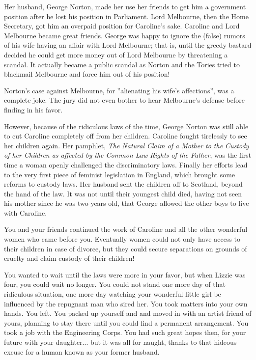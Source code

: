 \documentclass[char]{airship}
\begin{document}
Her husband, George Norton, made her use her friends to get him a
government position after he lost his position in Parliament. Lord
Melbourne, then the Home Secretary, got him an overpaid position for
Caroline's sake. Caroline and Lord Melbourne became great
friends. George was happy to ignore the (false) rumors of his wife
having an affair with Lord Melbourne; that is, until the greedy
bastard decided he could get more money out of Lord Melbourne by
threatening a scandal. It actually became a public scandal as Norton
and the Tories tried to blackmail Melbourne and force him out of his
position!

Norton's case against Melbourne, for ''alienating his wife's
affections'', was a complete joke. The jury did not even bother to
hear Melbourne's defense before finding in his favor.

However, because of the ridiculous laws of the time, George Norton was
still able to cut Caroline completely off from her children. Caroline
fought tirelessly to see her children again. Her pamphlet, {\em The
Natural Claim of a Mother to the Custody of her Children as affected
by the Common Law Rights of the Father}, was the first time a woman
openly challenged the discriminatory laws. Finally her efforts lead to
the very first piece of feminist legislation in England, which brought
some reforms to custody laws. Her husband sent the children off to
Scotland, beyond the hand of the law. It was not until their youngest
child died, having not seen his mother since he was two years old,
that George allowed the other boys to live with Caroline.

You and your friends continued the work of Caroline and all the other
wonderful women who came before you. Eventually women could not only
have access to their children in case of divorce, but they could
secure separations on grounds of cruelty and claim custody of their
children!

You wanted to wait until the laws were more in your favor, but when
Lizzie was four, you could wait no longer. You could not stand one
more day of that ridiculous situation, one more day watching your
wonderful little girl be influenced by the repugnant man who sired
her. You took matters into your own hands. You left. You packed up
yourself and \cThief{} and moved in with an artist friend of yours,
planning to stay there until you could find a permanent
arrangement. You took a job with the Engineering Corps. You had such
great hopes then, for your future with your daughter... but it was all
for naught, thanks to that hideous excuse for a human known as your
former husband.
\end{document}
